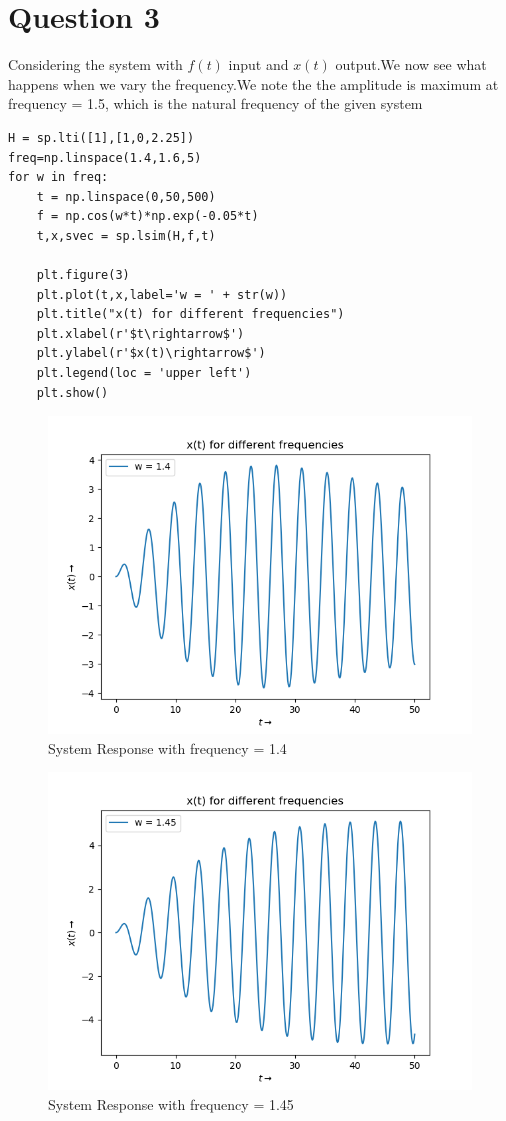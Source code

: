 \documentclass{article}
\begin{document}
\section*{Question 3}
Considering the system with $f(t)$ input and $x(t)$ output.We now see what happens when we vary the frequency.We note the the amplitude is maximum at frequency = 1.5, which is the natural frequency of the given system
\begin{verbatim}
H = sp.lti([1],[1,0,2.25])
freq=np.linspace(1.4,1.6,5)
for w in freq:
	t = np.linspace(0,50,500)
	f = np.cos(w*t)*np.exp(-0.05*t)
	t,x,svec = sp.lsim(H,f,t)
	
	plt.figure(3)
	plt.plot(t,x,label='w = ' + str(w))
	plt.title("x(t) for different frequencies")
	plt.xlabel(r'$t\rightarrow$')
	plt.ylabel(r'$x(t)\rightarrow$')
	plt.legend(loc = 'upper left')  
	plt.show()
\end{verbatim}
\begin{figure}[h!]
\centering
\includegraphics[scale=0.65]{fig3_6.png}
\caption{System Response with frequency = 1.4}
\label{fig:System Response with frequency = 1.4}
\end{figure}

\begin{figure}[h!]
\centering
\includegraphics[scale=0.7]{fig4_6.png}
\caption{System Response with frequency = 1.45}
\label{fig:System Response with frequency = 1.45}
\end{figure}
\end{document}
